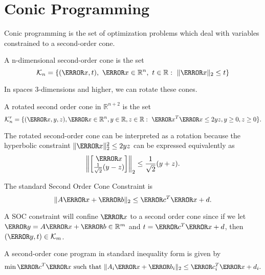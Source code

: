 \section{Conic Programming}
Conic programming is the set of optimization problems which deal with variables constrained to a second-order cone.
\begin{definition}
	A n-dimensional second-order cone is the set \[
		\mathcal{K}_n = \{(\V{x}, t),\ \V{x}\in\mathbb{R}^n,\ t\in\mathbb{R}:\ \|\V{x}\|_2 \leq t\}
	\]
	\label{defn:soc}
\end{definition}
In spaces 3-dimensions and higher, we can rotate these cones.
\begin{definition}
	A rotated second order cone in $\mathbb{R}^{n+2}$ is the set \[
		\mathcal{K}_n^r = \{(\V{x}, y, z),\V{x}\in\mathbb{R}^n, y\in\mathbb{R}, z\in\mathbb{R}:\ \V{x}^T\V{x} \leq 2yz, y\geq 0, z \geq 0 \}.
	\]
	\label{defn:rot-soc}
\end{definition}
The rotated second-order cone can be interpreted as a rotation because the hyperbolic constraint $\|\V{x}\|_2^2\leq 2yz$ can be expressed equivalently as
\[
	\left\lVert\begin{bmatrix}\V{x} \\ \frac{1}{\sqrt{2}}(y - z)\end{bmatrix}\right\rVert_2 \leq \frac{1}{\sqrt{2}}(y+z).
\]
\begin{definition}
	The standard Second Order Cone Constraint is \[
		\|A\V{x}+\V{b}\|_2 \leq \V{c}^T\V{x} +d.
	\]
	\label{defn:soc-const}
\end{definition}
A SOC constraint will confine $\V{x}$ to a second order cone since if we let $\V{y} = A\V{x}+\V{b} \in \mathbb{R}^m$ and $t = \V{c}^T\V{x}+d$, then $(\V{y}, t)\in\mathcal{K}_m$.
\begin{definition}
	A second-order cone program in standard inequality form is given by
	\[
		\min \V{c}^T\V{x} \text{ such that } \|A_i\V{x}+\V{b}_i\|_2 \leq \V{c}_i^T\V{x}+d_i.
	\]
	\label{defn:soc-program}
\end{definition}
